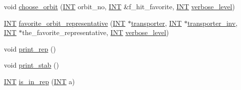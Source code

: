 \begin{DoxyCompactItemize}
\item 
void \mbox{\hyperlink{classchoose__points__or__lines_a17def7dc2b9407b483d887fb24fab74d}{choose\+\_\+orbit}} (\mbox{\hyperlink{galois_8h_a09fddde158a3a20bd2dcadb609de11dc}{I\+NT}} orbit\+\_\+no, \mbox{\hyperlink{galois_8h_a09fddde158a3a20bd2dcadb609de11dc}{I\+NT}} \&f\+\_\+hit\+\_\+favorite, \mbox{\hyperlink{galois_8h_a09fddde158a3a20bd2dcadb609de11dc}{I\+NT}} \mbox{\hyperlink{simeon_8_c_a818073fbcc2f439e7c56952f67386122}{verbose\+\_\+level}})
\item 
\mbox{\hyperlink{galois_8h_a09fddde158a3a20bd2dcadb609de11dc}{I\+NT}} \mbox{\hyperlink{classchoose__points__or__lines_ae2f603d9869c63a6ede08afc8e2da234}{favorite\+\_\+orbit\+\_\+representative}} (\mbox{\hyperlink{galois_8h_a09fddde158a3a20bd2dcadb609de11dc}{I\+NT}} $\ast$\mbox{\hyperlink{classchoose__points__or__lines_a0f8269ae48e76984b6cdbd0c25087159}{transporter}}, \mbox{\hyperlink{galois_8h_a09fddde158a3a20bd2dcadb609de11dc}{I\+NT}} $\ast$\mbox{\hyperlink{classchoose__points__or__lines_a234146c3e48b5e4e26d73c273f5e9cf1}{transporter\+\_\+inv}}, \mbox{\hyperlink{galois_8h_a09fddde158a3a20bd2dcadb609de11dc}{I\+NT}} $\ast$the\+\_\+favorite\+\_\+representative, \mbox{\hyperlink{galois_8h_a09fddde158a3a20bd2dcadb609de11dc}{I\+NT}} \mbox{\hyperlink{simeon_8_c_a818073fbcc2f439e7c56952f67386122}{verbose\+\_\+level}})
\item 
void \mbox{\hyperlink{classchoose__points__or__lines_a9ddb55ec204f9df972d5eb9e2cc9a118}{print\+\_\+rep}} ()
\item 
void \mbox{\hyperlink{classchoose__points__or__lines_abf1e533cc3e4f9c0cdbe95f2cdfa5547}{print\+\_\+stab}} ()
\item 
\mbox{\hyperlink{galois_8h_a09fddde158a3a20bd2dcadb609de11dc}{I\+NT}} \mbox{\hyperlink{classchoose__points__or__lines_a786e13320ca0ee6ebb22eea476510362}{is\+\_\+in\+\_\+rep}} (\mbox{\hyperlink{galois_8h_a09fddde158a3a20bd2dcadb609de11dc}{I\+NT}} a)
\end{DoxyCompactItemize}
